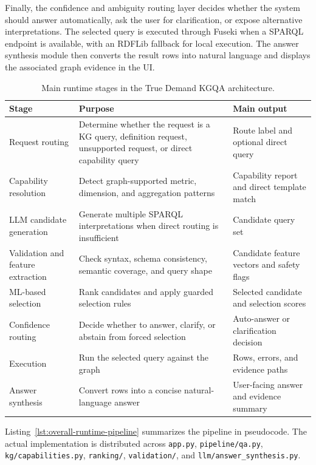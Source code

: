 Finally, the confidence and ambiguity routing layer decides whether the system should answer automatically, ask the user for clarification, or expose alternative interpretations. The selected query is executed through Fuseki when a SPARQL endpoint is available, with an RDFLib fallback for local execution. The answer synthesis module then converts the result rows into natural language and displays the associated graph evidence in the UI.

\begin{table}[ht]
\centering
\caption{Main runtime stages in the True Demand KGQA architecture.}
\label{tab:runtime-stages}
\begin{tabular}{p{3.2cm}p{5.2cm}p{5.2cm}}
\hline
\textbf{Stage} & \textbf{Purpose} & \textbf{Main output} \\
\hline
Request routing & Determine whether the request is a KG query, definition request, unsupported request, or direct capability query & Route label and optional direct query \\
Capability resolution & Detect graph-supported metric, dimension, and aggregation patterns & Capability report and direct template match \\
LLM candidate generation & Generate multiple SPARQL interpretations when direct routing is insufficient & Candidate query set \\
Validation and feature extraction & Check syntax, schema consistency, semantic coverage, and query shape & Candidate feature vectors and safety flags \\
ML-based selection & Rank candidates and apply guarded selection rules & Selected candidate and selection scores \\
Confidence routing & Decide whether to answer, clarify, or abstain from forced selection & Auto-answer or clarification decision \\
Execution & Run the selected query against the graph & Rows, errors, and evidence paths \\
Answer synthesis & Convert rows into a concise natural-language answer & User-facing answer and evidence summary \\
\hline
\end{tabular}
\end{table}

Listing~\ref{lst:overall-runtime-pipeline} summarizes the pipeline in pseudocode. The actual implementation is distributed across \texttt{app.py}, \texttt{pipeline/qa.py}, \texttt{kg/capabilities.py}, \texttt{ranking/}, \texttt{validation/}, and \texttt{llm/answer\_synthesis.py}.

